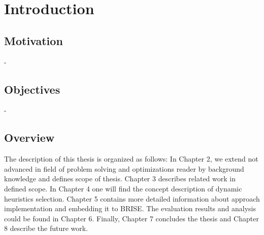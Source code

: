 \chapter{Introduction}\label{intro}


\section{Motivation}
- 


\section{Objectives}
- 

  	
\section{Overview}
The description of this thesis is organized as follows: In Chapter 2, we extend not advanced in field of problem solving and optimizations reader by background knowledge and defines scope of thesis. Chapter 3 describes related work in defined scope. In Chapter 4 one will find the concept description of dynamic heuristics selection. Chapter 5 contains more detailed information about approach implementation and  embedding it to BRISE. The evaluation results and analysis could be found in Chapter 6. Finally, Chapter 7 concludes the thesis and Chapter 8 describe the future work.

